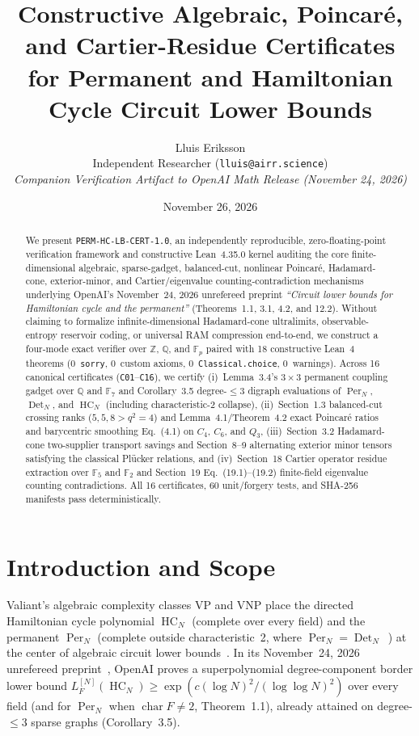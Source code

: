 \documentclass[10pt,twocolumn]{article}
\title{\textbf{Constructive Algebraic, Poincar\'e, and Cartier-Residue Certificates for Permanent and Hamiltonian Cycle Circuit Lower Bounds}}
\author{Lluis Eriksson\\
\small Independent Researcher \quad(\texttt{lluis@airr.science})\\
\small \textit{Companion Verification Artifact to OpenAI Math Release (November 24, 2026)}}
\date{November 26, 2026}
\begin{document}
\maketitle

\begin{abstract}
We present \texttt{PERM-HC-LB-CERT-1.0}, an independently reproducible, zero-floating-point verification framework and constructive Lean~4.35.0 kernel auditing the core finite-dimensional algebraic, sparse-gadget, balanced-cut, nonlinear Poincar\'e, Hadamard-cone, exterior-minor, and Cartier/eigenvalue counting-contradiction mechanisms underlying OpenAI's November~24, 2026 unrefereed preprint \emph{``Circuit lower bounds for Hamiltonian cycle and the permanent''} (Theorems~1.1, 3.1, 4.2, and 12.2). Without claiming to formalize infinite-dimensional Hadamard-cone ultralimits, observable-entropy reservoir coding, or universal RAM compression end-to-end, we construct a four-mode exact verifier over $\mathbb{Z}$, $\mathbb{Q}$, and $\mathbb{F}_p$ paired with 18 constructive Lean~4 theorems (0~\texttt{sorry}, 0~custom axioms, 0~\texttt{Classical.choice}, 0~warnings). Across 16 canonical certificates (\texttt{C01}--\texttt{C16}), we certify (i)~Lemma~3.4's $3\times 3$ permanent coupling gadget over $\mathbb{Q}$ and $\mathbb{F}_7$ and Corollary~3.5 degree-$\le 3$ digraph evaluations of $\operatorname{Per}_N$, $\operatorname{Det}_N$, and $\operatorname{HC}_N$ (including characteristic-2 collapse), (ii)~Section~1.3 balanced-cut crossing ranks ($5,5,8 > q^2=4$) and Lemma~4.1/Theorem~4.2 exact Poincar\'e ratios and barycentric smoothing Eq.~(4.1) on $C_4$, $C_6$, and $Q_3$, (iii)~Section~3.2 Hadamard-cone two-supplier transport savings and Section~8--9 alternating exterior minor tensors satisfying the classical Pl\"ucker relations, and (iv)~Section~18 Cartier operator residue extraction over $\mathbb{F}_5$ and $\mathbb{F}_2$ and Section~19 Eq.~(19.1)--(19.2) finite-field eigenvalue counting contradictions. All 16 certificates, 60 unit/forgery tests, and SHA-256 manifests pass deterministically.
\end{abstract}

\section{Introduction and Scope}
Valiant's algebraic complexity classes $\mathrm{VP}$ and $\mathrm{VNP}$ place the directed Hamiltonian cycle polynomial $\operatorname{HC}_N$ (complete over every field) and the permanent $\operatorname{Per}_N$ (complete outside characteristic~2, where $\operatorname{Per}_N = \operatorname{Det}_N$~\cite{berkowitz1984computing}) at the center of algebraic circuit lower bounds~\cite{valiant1979completeness}. In its November~24, 2026 unrefereed preprint~\cite{openai2026permhc}, OpenAI proves a superpolynomial degree-component border lower bound $L^{[N]}_F(\operatorname{HC}_N) \ge \exp(c(\log N)^2/(\log\log N)^2)$ over every field (and for $\operatorname{Per}_N$ when $\operatorname{char} F \ne 2$, Theorem~1.1), already attained on degree-$\le 3$ sparse graphs (Corollary~3.5).
\end{document}
